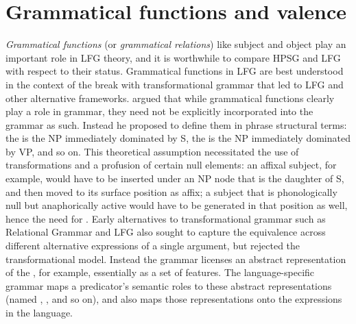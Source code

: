 \section{Grammatical functions and valence} 
\label{valence-sec}
\emph{Grammatical functions}  (or \emph{grammatical relations})  like subject and object play an important role in LFG theory,  and it is worthwhile to compare HPSG and LFG with respect to their status.  Grammatical functions in LFG are best understood in the context of the break with transformational grammar that led to LFG and other alternative frameworks.  \citet{Chomsky65a} argued that while grammatical functions clearly play a role in  grammar, they need not be explicitly incorporated into the grammar as such.  Instead he proposed to define them in phrase structural terms: the  is the NP immediately dominated by S, the  is the NP immediately dominated by VP, and so on.   This theoretical
assumption necessitated the use of transformations and a
profusion of certain null elements: an affixal subject, for example,
would have to be inserted under an NP node that is the daughter of S, and then moved to its surface position as affix; a subject that is phonologically null but anaphorically active would have to be generated in that position as well, hence the need for .  Early alternatives to transformational grammar such as Relational Grammar \citep{Perlmutter83a-ed} and LFG also sought to  capture the equivalence
across different alternative expressions of a single argument, but
rejected the transformational model.   Instead the grammar licenses an abstract representation of the , for example, essentially as a set of features.  The language-specific grammar maps a predicator's semantic roles to these abstract representations (named , , and so on), and also maps those representations onto the expressions in the language.  

